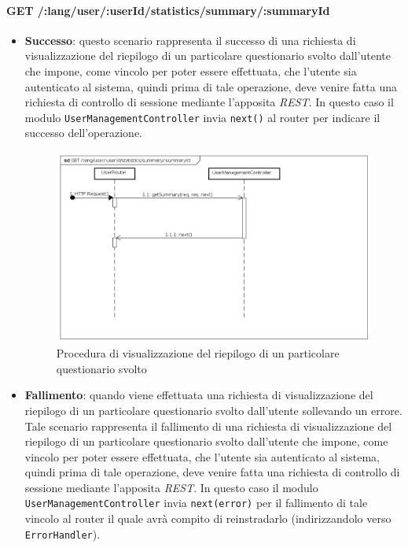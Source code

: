 \paragraph{GET /:lang/user/:userId/statistics/summary/:summaryId}
\begin{itemize}
\item \textbf{Successo}: questo scenario rappresenta il successo di una richiesta di visualizzazione del riepilogo di un particolare questionario svolto dall'utente che impone, come vincolo per poter essere effettuata, che l'utente sia autenticato al sistema, quindi prima di tale operazione, deve venire fatta una richiesta di controllo di sessione mediante l'apposita \textit{REST}.  
In questo caso il modulo \texttt{UserManagementController} invia \texttt{next()} al router per indicare il successo dell'operazione.
\label{Procedura di visualizzazione del riepilogo di un particolare questionario svolto}
\begin{figure}[ht]
	\centering
	\includegraphics[scale=0.40]{UML/DiagrammiDiSequenza/Back-end/GET_LangUserUserIdStatisticsSummarySummaryIdSuccess.png}
	\caption{Procedura di visualizzazione del riepilogo di un particolare questionario svolto}
\end{figure}
\FloatBarrier
\item \textbf{Fallimento}: quando viene effettuata una richiesta di visualizzazione del riepilogo di un particolare questionario svolto dall'utente sollevando un errore. Tale scenario rappresenta il fallimento di una richiesta di visualizzazione del riepilogo di un particolare questionario svolto dall'utente che impone, come vincolo per poter essere effettuata, che l'utente sia autenticato al sistema, quindi prima di tale operazione, deve venire fatta una richiesta di controllo di sessione mediante l'apposita \textit{REST}. In questo caso il modulo \texttt{UserManagementController} invia \texttt{next(error)} per il fallimento di tale vincolo al router il quale avrà compito di reinstradarlo (indirizzandolo verso \texttt{ErrorHandler}).

\end{itemize}
